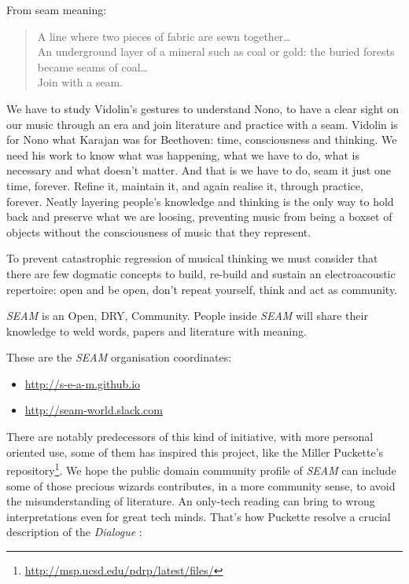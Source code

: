\documentclass[twoside,a4paper]{article}
\begin{document}
From seam meaning:

\begin{quote}
\begin{it}
A line where two pieces of fabric are sewn together\ldots \\
An underground layer of a mineral such as coal or gold: the buried forests
became seams of coal\ldots\\
Join with a seam.
\end{it}
\end{quote}

We have to study Vidolin's gestures to understand Nono, to have a clear sight on
our music through an era and join literature and practice with a seam. Vidolin is
for Nono what Karajan was for Beethoven: time, consciousness and thinking. We
need his work to know what was happening, what we have to do, what is necessary
and what doesn't matter. And that is we have to do, seam it just one time,
forever. Refine it, maintain it, and again realise it, through practice, forever.
Neatly layering people's knowledge and thinking is the only way to hold back and
preserve what we are loosing, preventing music from being a boxset of objects
without the consciousness of music that they represent.

To prevent catastrophic regression of musical thinking we must consider that
there are few dogmatic concepts to build, re-build and sustain an
electroacoustic repertoire: open and be open, don't repeat
yourself, think and act as community.


\emph{SEAM} is an Open, DRY, Community. People inside \emph{SEAM} will share their
knowledge to weld words, papers and literature with meaning.

These are the \emph{SEAM} organisation coordinates:
\begin{itemize}
\item \url{http://s-e-a-m.github.io}
\item \url{http://seam-world.slack.com}
\end{itemize}

There are notably predecessors of this kind of initiative, with more personal
oriented use, some of them has inspired this project, like the Miller Puckette's
repository\footnote{\url{http://msp.ucsd.edu/pdrp/latest/files/}}. We hope the
public domain community profile of \emph{SEAM} can include some of those precious
wizards contributes, in a more community sense, to avoid the misunderstanding
of literature. An only-tech reading can bring to wrong interpretations even for
great tech minds. That's how Puckette \cite{mp01} resolve a crucial description
of the \emph{Dialogue} \cite{pbdod85}:
\end{document}
